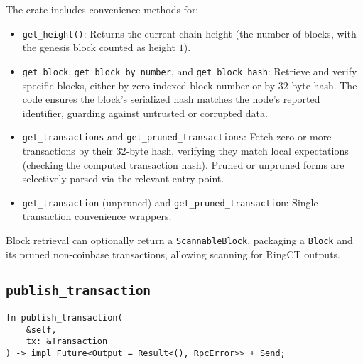 \documentclass[12pt,a4paper]{article}
\begin{document}
The crate includes convenience methods for:
\begin{itemize}
    \item \texttt{get\_height()}: Returns the current chain height (the number
    of blocks, with the genesis block counted as height $1$). %
    \item \texttt{get\_block}, \texttt{get\_block\_by\_number}, and
    \texttt{get\_block\_hash}: Retrieve and verify specific blocks, either by
    zero-indexed block number or by $32$-byte hash.  The code ensures the block’s
    serialized hash matches the node’s reported identifier, guarding against
    untrusted or corrupted data. %
    \item \texttt{get\_transactions} and \texttt{get\_pruned\_transactions}: %
    Fetch zero or more transactions by their $32$-byte hash, verifying they match
    local expectations (checking the computed transaction hash).  Pruned or
    unpruned forms are selectively parsed via the relevant entry point.
    \item \texttt{get\_transaction} (unpruned) and
    \texttt{get\_pruned\_transaction}: Single-transaction convenience wrappers. %
\end{itemize}

Block retrieval can optionally return a \texttt{ScannableBlock}, packaging a
\texttt{Block} and its pruned non-coinbase transactions, allowing scanning for
RingCT outputs. %

\subsection{\texttt{publish\_transaction}}
\label{sec:monero-rpc-rpc-trait-publish}

\begin{verbatim}
fn publish_transaction(
    &self,
    tx: &Transaction
) -> impl Future<Output = Result<(), RpcError>> + Send;
\end{verbatim}
\end{document}
